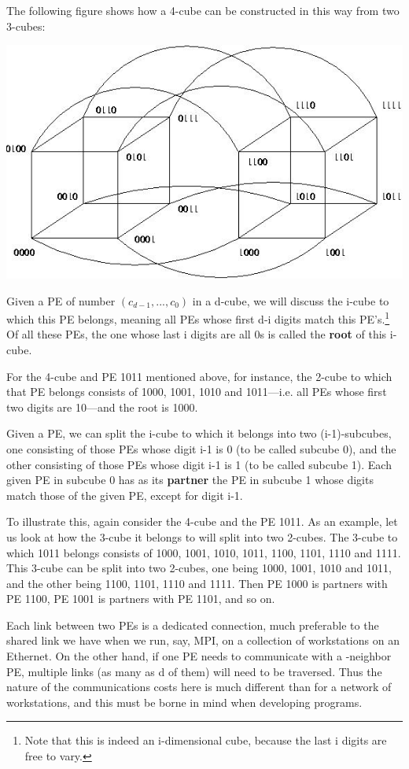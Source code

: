 The following figure shows how a 4-cube can be constructed in this way from
two 3-cubes:

\includegraphics{Images/16cube.jpg} 

Given a PE of number \( (c_{d-1},...,c_{0}) \) in a d-cube, we will
discuss the i-cube to which this PE belongs, meaning all PEs whose first
d-i digits match this PE's.\footnote{Note that this is indeed an
i-dimensional cube, because the last i digits are free to vary.} Of all
these PEs, the one whose last i digits are all 0s is called the
\textbf{root} of this i-cube.

For the 4-cube and PE 1011 mentioned above, for instance, the 2-cube to
which that PE belongs consists of 1000, 1001, 1010 and 1011---i.e. all
PEs whose first two digits are 10---and the root is 1000.

Given a PE, we can split the i-cube to which it belongs into two
(i-1)-subcubes, one consisting of those PEs whose digit i-1 is 0 (to be
called subcube 0), and the other consisting of those PEs whose digit i-1
is 1 (to be called subcube 1).  Each given PE in subcube 0 has as its
\textbf{partner} the PE in subcube 1 whose digits match those of the
given PE, except for digit i-1.

To illustrate this, again consider the 4-cube and the PE 1011. As an
example, let us look at how the 3-cube it belongs to will split into two
2-cubes. The 3-cube to which 1011 belongs consists of 1000, 1001, 1010,
1011, 1100, 1101, 1110 and 1111. This 3-cube can be split into two
2-cubes, one being 1000, 1001, 1010 and 1011, and the other being 1100,
1101, 1110 and 1111. Then PE 1000 is partners with PE 1100, PE 1001 is
partners with PE 1101, and so on.

Each link between two PEs is a dedicated connection, much preferable to
the shared link we have when we run, say, MPI, on a collection of
workstations on an Ethernet. On the other hand, if one PE needs to
communicate with a -neighbor PE, multiple links (as many
as d of them) will need to be traversed. Thus the nature of the
communications costs here is much different than for a network of
workstations, and this must be borne in mind when developing programs.

